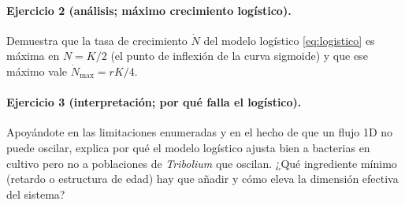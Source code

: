 \paragraph{Ejercicio 2 (análisis; máximo crecimiento logístico).} Demuestra que la tasa de crecimiento $\dot{N}$ del modelo logístico \eqref{eq:logistico} es máxima en $N=K/2$ (el punto de inflexión de la curva sigmoide) y que ese máximo vale $\dot{N}_{\max}=rK/4$.

\paragraph{Ejercicio 3 (interpretación; por qué falla el logístico).} Apoyándote en las limitaciones enumeradas y en el hecho de que un flujo 1D no puede oscilar, explica por qué el modelo logístico ajusta bien a bacterias en cultivo pero no a poblaciones de \emph{Tribolium} que oscilan. ¿Qué ingrediente mínimo (retardo o estructura de edad) hay que añadir y cómo eleva la dimensión efectiva del sistema?

